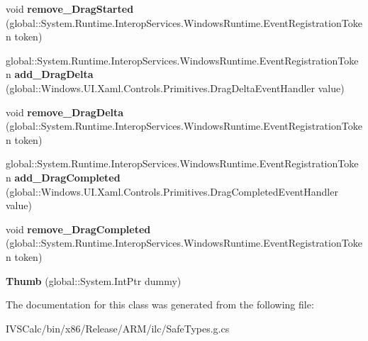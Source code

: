 \begin{DoxyCompactItemize}
\item 
\mbox{\label{class_windows_1_1_u_i_1_1_xaml_1_1_controls_1_1_primitives_1_1_thumb_a44985b0beddf8dcf180137b37763091e}} 
void {\bfseries remove\+\_\+\+Drag\+Started} (global\+::\+System.\+Runtime.\+Interop\+Services.\+Windows\+Runtime.\+Event\+Registration\+Token token)
\item 
\mbox{\label{class_windows_1_1_u_i_1_1_xaml_1_1_controls_1_1_primitives_1_1_thumb_ab21b89a45b43ce6913868468c69ad277}} 
global\+::\+System.\+Runtime.\+Interop\+Services.\+Windows\+Runtime.\+Event\+Registration\+Token {\bfseries add\+\_\+\+Drag\+Delta} (global\+::\+Windows.\+U\+I.\+Xaml.\+Controls.\+Primitives.\+Drag\+Delta\+Event\+Handler value)
\item 
\mbox{\label{class_windows_1_1_u_i_1_1_xaml_1_1_controls_1_1_primitives_1_1_thumb_aafa7ff7377726fee9d57013616690ae3}} 
void {\bfseries remove\+\_\+\+Drag\+Delta} (global\+::\+System.\+Runtime.\+Interop\+Services.\+Windows\+Runtime.\+Event\+Registration\+Token token)
\item 
\mbox{\label{class_windows_1_1_u_i_1_1_xaml_1_1_controls_1_1_primitives_1_1_thumb_a78452356d0361197920635b5002bf90f}} 
global\+::\+System.\+Runtime.\+Interop\+Services.\+Windows\+Runtime.\+Event\+Registration\+Token {\bfseries add\+\_\+\+Drag\+Completed} (global\+::\+Windows.\+U\+I.\+Xaml.\+Controls.\+Primitives.\+Drag\+Completed\+Event\+Handler value)
\item 
\mbox{\label{class_windows_1_1_u_i_1_1_xaml_1_1_controls_1_1_primitives_1_1_thumb_a097aeafd8ad0e07599e35793e0ef16ca}} 
void {\bfseries remove\+\_\+\+Drag\+Completed} (global\+::\+System.\+Runtime.\+Interop\+Services.\+Windows\+Runtime.\+Event\+Registration\+Token token)
\item 
\mbox{\label{class_windows_1_1_u_i_1_1_xaml_1_1_controls_1_1_primitives_1_1_thumb_acd7bc9b9e039aaac5e1b684e7f15f078}} 
{\bfseries Thumb} (global\+::\+System.\+Int\+Ptr dummy)
\end{DoxyCompactItemize}


The documentation for this class was generated from the following file\+:\begin{DoxyCompactItemize}
\item 
I\+V\+S\+Calc/bin/x86/\+Release/\+A\+R\+M/ilc/Safe\+Types.\+g.\+cs\end{DoxyCompactItemize}
